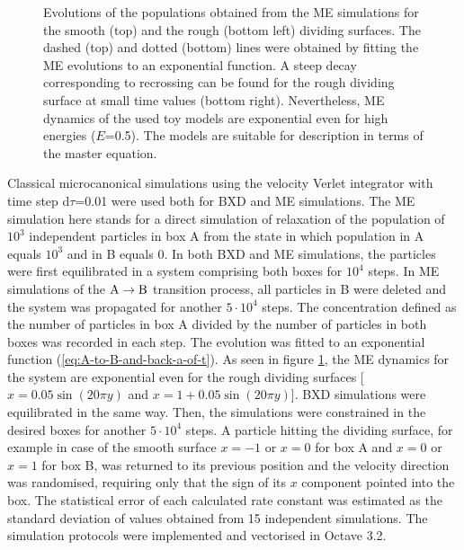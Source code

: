 \begin{figure}[h]
\caption[Exponential kinetics of the toy models.]{Evolutions of the populations obtained from the ME simulations for the smooth (top) and the rough (bottom left) dividing surfaces. The dashed (top) and dotted (bottom) lines were obtained by fitting the ME evolutions to an exponential function. A steep decay corresponding to recrossing can be found for the rough dividing surface at small time values (bottom right). Nevertheless, ME dynamics of the used toy models are exponential even for high energies ($E$=0.5). The models are suitable for description in terms of the master equation.}
\label{fig:me-exp}
\end{figure}

Classical microcanonical simulations using the velocity Verlet integrator\cite{Verlet1967} with time step d$\tau$=0.01 were used both for BXD and ME simulations.
The ME simulation here stands for a direct simulation of relaxation of the population of $10^3$ independent particles in box A from the state in which population in A equals $10^3$ and in B equals 0.
In both BXD and ME simulations, the particles were first equilibrated in a system comprising both boxes for $10^4$ steps.
In ME simulations of the ${\rm A \rightarrow B}$ transition process, all particles in B were deleted and the system was propagated for another $5\cdot10^4$ steps.
The concentration defined as the number of particles in box A divided by the number of particles in both boxes was recorded in each step.
The evolution was fitted to an exponential function (\ref{eq:A-to-B-and-back-a-of-t}).
As seen in figure \ref{fig:me-exp}, the ME dynamics for the system are exponential even for the rough dividing surfaces [$x = 0.05 \sin (20 \pi y)$ and $x = 1 + 0.05 \sin (20 \pi y)$].
BXD simulations were equilibrated in the same way.
Then, the simulations were constrained in the desired boxes for another $5\cdot10^4$ steps.
A particle hitting the dividing surface, for example in case of the smooth surface $x = -1$ or $x = 0$ for box A and $x = 0$ or $x = 1$ for box B, was returned to its previous position and the velocity direction was randomised, requiring only that the sign of its $x$ component pointed into the box.
The statistical error of each calculated rate constant was estimated as the standard deviation of values obtained from 15 independent simulations.
The simulation protocols were implemented and vectorised in Octave 3.2.\cite{Octave2012}

